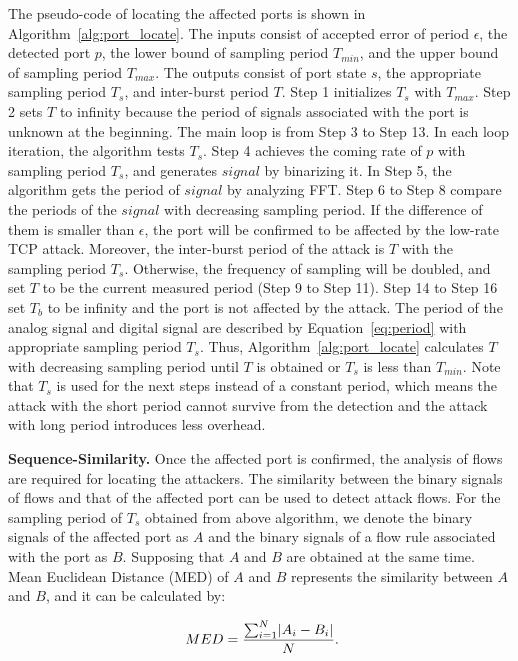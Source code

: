\documentclass[conference]{IEEEtran}
\begin{document}
The pseudo-code of locating the affected ports is shown in Algorithm~\ref{alg:port_locate}. The inputs consist of accepted error of period $\epsilon$, the detected port $p$, the lower bound of sampling period $T_{min}$, and the upper bound of sampling period $T_{max}$. The outputs consist of port state $s$, the appropriate sampling period $T_s$, and inter-burst period $T$. Step 1 initializes $T_s$ with $T_{max}$. Step 2 sets $T$ to infinity because the period of signals associated with the port is unknown at the beginning. The main loop is from Step 3 to Step 13. In each loop iteration, the algorithm tests $T_s$. Step 4 achieves the coming rate of $p$ with sampling period $T_s$, and generates $signal$ by binarizing it. In Step 5, the algorithm gets the period of $signal$ by analyzing FFT. Step 6 to Step 8 compare the periods of the $signal$ with decreasing sampling period. If the difference of them is smaller than $\epsilon$, the port will be confirmed to be affected by the low-rate TCP attack. Moreover, the inter-burst period of the attack is $T$ with the sampling period $T_s$. Otherwise, the frequency of sampling will be doubled, and set $T$ to be the current measured period (Step 9 to Step 11). Step 14 to Step 16 set $T_b$ to be infinity and the port is not affected by the attack. The period of the analog signal and digital signal are described by Equation~\ref{eq:period} with appropriate sampling period $T_s$. Thus, Algorithm~\ref{alg:port_locate} calculates $T$ with decreasing sampling period until $T$ is obtained or $T_s$ is less than $T_{min}$. Note that $T_s$ is used for the next steps instead of a constant period, which means the attack with the short period cannot survive from the detection and the attack with long period introduces less overhead.


\noindent \textbf{Sequence-Similarity.} Once the affected port is confirmed, the analysis of flows are required for locating the attackers. The similarity between the binary signals of flows and that of the affected port can be used to detect attack flows. For the sampling period of $T_s$ obtained from above algorithm, we denote the binary signals of the affected port as $A$ and the binary signals of a flow rule associated with the port as $B$. Supposing that $A$ and $B$ are obtained at the same time. Mean Euclidean Distance (MED) of $A$ and $B$ represents the similarity between $ A $ and $B$, and it can be calculated by:

\vspace{-0.05in}
\begin{equation}\label{eq:euclidean_distance}
\ MED=\frac{\sum_{i=1}^{N}\lvert A_{i} - B_{i}\rvert}{N}.
\vspace{-0.05in}
\end{equation}
\end{document}
